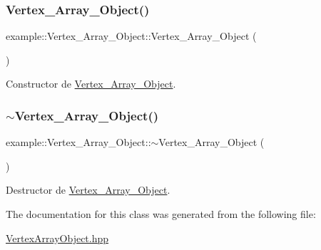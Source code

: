 \subsubsection{\texorpdfstring{Vertex\_Array\_Object()}{Vertex\_Array\_Object()}\hspace{0.1cm}{\footnotesize\ttfamily [2/2]}}
{\footnotesize\ttfamily example\+::\+Vertex\+\_\+\+Array\+\_\+\+Object\+::\+Vertex\+\_\+\+Array\+\_\+\+Object (\begin{DoxyParamCaption}{ }\end{DoxyParamCaption})\hspace{0.3cm}{\ttfamily [inline]}}



Constructor de \mbox{\hyperlink{classexample_1_1_vertex___array___object}{Vertex\+\_\+\+Array\+\_\+\+Object}}. 

\mbox{\label{classexample_1_1_vertex___array___object_a28b31b831260324b9bdf76e428ae0a4a}} 
\subsubsection{\texorpdfstring{$\sim$Vertex\_Array\_Object()}{~Vertex\_Array\_Object()}}
{\footnotesize\ttfamily example\+::\+Vertex\+\_\+\+Array\+\_\+\+Object\+::$\sim$\+Vertex\+\_\+\+Array\+\_\+\+Object (\begin{DoxyParamCaption}{ }\end{DoxyParamCaption})\hspace{0.3cm}{\ttfamily [inline]}}



Destructor de \mbox{\hyperlink{classexample_1_1_vertex___array___object}{Vertex\+\_\+\+Array\+\_\+\+Object}}. 



The documentation for this class was generated from the following file\+:\begin{DoxyCompactItemize}
\item 
\mbox{\hyperlink{_vertex_array_object_8hpp}{Vertex\+Array\+Object.\+hpp}}\end{DoxyCompactItemize}
